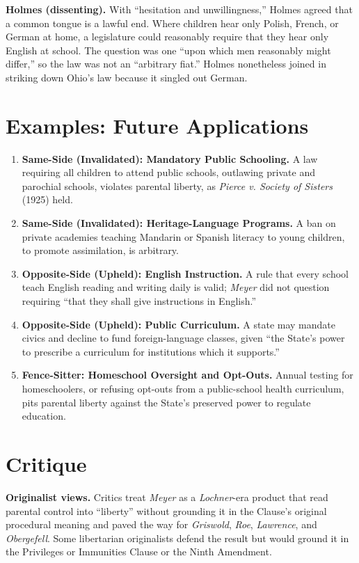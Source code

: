 \documentclass[12pt]{article}
\begin{document}
\textbf{Holmes (dissenting).} With ``hesitation and unwillingness,'' Holmes agreed that a common tongue is a lawful end. Where children hear only Polish, French, or German at home, a legislature could reasonably require that they hear only English at school. The question was one ``upon which men reasonably might differ,'' so the law was not an ``arbitrary fiat.'' Holmes nonetheless joined in striking down Ohio's law because it singled out German.

\section{Examples: Future Applications}

\begin{enumerate}
\item \textbf{Same-Side (Invalidated): Mandatory Public Schooling.} A law requiring all children to attend public schools, outlawing private and parochial schools, violates parental liberty, as \textit{Pierce v. Society of Sisters} (1925) held.
\item \textbf{Same-Side (Invalidated): Heritage-Language Programs.} A ban on private academies teaching Mandarin or Spanish literacy to young children, to promote assimilation, is arbitrary.
\item \textbf{Opposite-Side (Upheld): English Instruction.} A rule that every school teach English reading and writing daily is valid; \textit{Meyer} did not question requiring ``that they shall give instructions in English.''
\item \textbf{Opposite-Side (Upheld): Public Curriculum.} A state may mandate civics and decline to fund foreign-language classes, given ``the State's power to prescribe a curriculum for institutions which it supports.''
\item \textbf{Fence-Sitter: Homeschool Oversight and Opt-Outs.} Annual testing for homeschoolers, or refusing opt-outs from a public-school health curriculum, pits parental liberty against the State's preserved power to regulate education.
\end{enumerate}

\section{Critique}

\textbf{Originalist views.} Critics treat \textit{Meyer} as a \textit{Lochner}-era product that read parental control into ``liberty'' without grounding it in the Clause's original procedural meaning and paved the way for \textit{Griswold}, \textit{Roe}, \textit{Lawrence}, and \textit{Obergefell}. Some libertarian originalists defend the result but would ground it in the Privileges or Immunities Clause or the Ninth Amendment.
\end{document}
